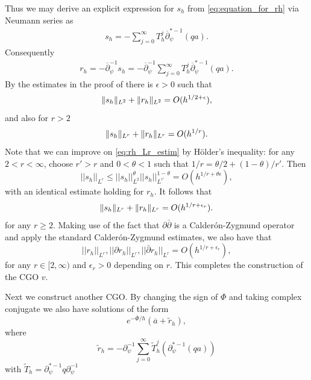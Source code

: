 \documentclass[12pt]{amsart}
\def\p{\partial}
\DeclarePairedDelimiter\norm{\lVert}{\rVert}
\theoremstyle{definition}
\theoremstyle{remark}
\newcommand{\eps}{\epsilon}
\newcommand{\op}{\overline \p}
\begin{document}
Thus we may derive an explicit expression for $s_h$ from \eqref{eq:equation_for_rh} via Neumann series as
\begin{eqnarray}
\label{eq: def of sh}
 s_h=-\sum_{j=0}^\infty T_h^j\op_\psi^{*-1}(qa). 
 \end{eqnarray}
Consequently
\begin{eqnarray}
\label{eq: def of rh}
 r_h=-\overline{\p}_\psi^{-1}s_h=-  \overline{\p}_\psi^{-1}\sum_{j=0}^\infty T_h^j\op_\psi^{*-1}(qa).
\end{eqnarray}
By the estimates in the proof of \cite[Lemma 3.2]{guillarmou2011identification} there is $\eps>0$ such that 
\begin{equation}\label{eq:rh_L2_estim}
 \norm{s_h}_{L^2}+\norm{r_h}_{L^2}=O(h^{1/2+\eps}),
\end{equation}
and also for $r>2$
\begin{equation}\label{eq:rh_Lr_estim}
 \norm{s_h}_{L^r}+\norm{r_h}_{L^r}=O(h^{1/r}).
\end{equation}
{\color{black} Note that we can improve on \eqref{eq:rh_Lr_estim} by {\color{black}H\"older's inequality}: for any $2<r<\infty$, choose $r'>r$ and $0<\theta<1$ such that $1/r=\theta/2+(1-\theta)/r'$. Then
\begin{equation}
||s_h||_{L^r}\leq ||s_h||_{L^2}^\theta ||s_h||_{L^{r'}}^{1-\theta}=O(h^{1/r+\theta\epsilon}),
\end{equation}
with an identical estimate holding for $r_h$. It follows that 
\begin{equation}\label{eq:rh_Lr_interpolation_estimate}
 \norm{s_h}_{L^r}+\norm{r_h}_{L^r}=O(h^{1/r+\eps_r}).
\end{equation}
for any $r\geq 2$.
}{\color{black}
Making use of the fact that $\partial\bar\partial$ is a Calder\'on-Zygmund operator and apply the standard Calder\'on-Zygmund estimates, we also have that
\begin{equation}\label{eq:CZ_rh_norms}
||r_h||_{L^r},  ||\partial r_h||_{L^r}, ||\bar\partial r_h||_{L^r}=O(h^{1/r+\epsilon_r}),
\end{equation}
for any $r\in[2,\infty)$ and $\epsilon_r >0$ depending on $r$.
}
This completes the construction of the CGO $v$.


Next we construct another CGO. By changing the sign of $\Phi$ and taking complex conjugate we also have solutions of the form
\[
 e^{-\overline \Phi/h}(\overline a+\tilde r_h),
\]
where 
\[
 \tilde r_h=-\p_\psi^{-1}\sum_{j=0}^\infty \tilde T_h^j(\p_{\psi}^{*-1} (q a))
\]
with $\tilde T_h =  \p_{\psi}^{*-1}q\p_\psi^{-1}$
\end{document}
